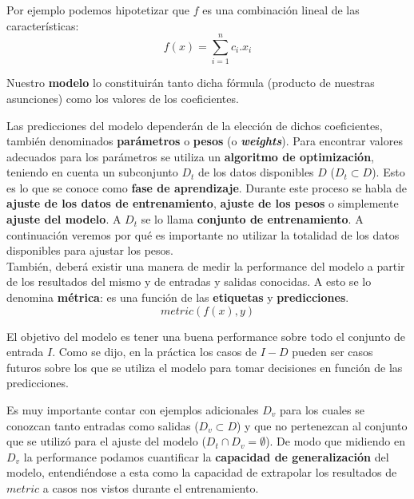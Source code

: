 Por ejemplo podemos hipotetizar que $f$ es una combinación lineal de las características:
\begin{equation*}
    f(x) = \sum_{i=1}^n c_i . x_i 
\end{equation*}

Nuestro \textbf{modelo} lo constituirán tanto dicha fórmula (producto de nuestras asunciones) como los valores de los coeficientes. 

Las predicciones del modelo dependerán de la elección de dichos coeficientes, también denominados \textbf{parámetros} o \textbf{pesos} (o \textbf{\textit{weights}}). Para encontrar valores adecuados para los parámetros se utiliza un \textbf{algoritmo de optimización}, teniendo en cuenta un subconjunto $D_t$ de los datos disponibles $D$ ($D_t \subset D$). Esto es lo que se conoce como \textbf{fase de aprendizaje}. Durante este proceso se habla de \textbf{ajuste de los datos de entrenamiento}, \textbf{ajuste de los pesos} o simplemente \textbf{ajuste del modelo}. A $D_t$ se lo llama \textbf{conjunto de entrenamiento}. A continuación veremos por qué es importante no utilizar la totalidad de los datos disponibles para ajustar los pesos. \\

También, deberá existir una manera de medir la performance del modelo a partir de los resultados del mismo y de entradas y salidas conocidas. A esto se lo denomina \textbf{métrica}: es una función de las \textbf{etiquetas} y \textbf{predicciones}.
\begin{equation*}
    metric( f(x), y )
\end{equation*}

El objetivo del modelo es tener una buena performance sobre todo el conjunto de entrada $I$. Como se dijo, en la práctica los casos de $I-D$ pueden ser casos futuros sobre los que se utiliza el modelo para tomar decisiones en función de las predicciones.

Es muy importante contar con ejemplos adicionales $D_v$ para los cuales se conozcan tanto entradas como salidas ($D_v \subset D$) y que no pertenezcan al conjunto que se utilizó para el ajuste del modelo ($D_t \cap D_v = \emptyset$). De modo que midiendo en $D_v$ la performance podamos cuantificar la \textbf{capacidad de generalización} del modelo, entendiéndose a esta como la capacidad de extrapolar los resultados de $metric$ a casos nos vistos durante el entrenamiento.


